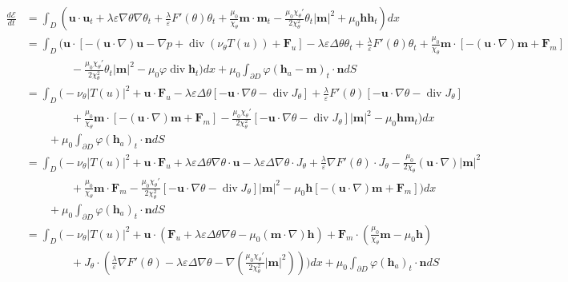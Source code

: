 \documentclass[10pt,letterpaper,twoside]{amsart}
\theoremstyle{definition}{\newtheorem{definition}[lemma]{Definition}}
\theoremstyle{note}{\newtheorem{claim}{Claim}[section]
\newtheorem*{claim*}{Claim}}
\numberwithin{equation}{section}
\newcommand{\dom}{D}
\newcommand{\Grad}{\nabla}
\newcommand{\Div}{\operatorname{div}}
\newcommand{\bu}{\mathbf{u}}
\newcommand{\bm}{\mathbf{m}}
\newcommand{\Fu}{\mathbf{F}_u}
\newcommand{\Fm}{\mathbf{F}_m}
\newcommand{\Jtheta}{J_\theta}
\newcommand{\bh}{\mathbf{h}}
\begin{document}
\begin{align*}
	\frac{d\mathcal{E}}{dt} & = \int_{\dom} \left(\bu\cdot \bu_t + \lambda \varepsilon \Grad\theta\Grad\theta_t + \frac{\lambda}{\varepsilon}F'(\theta)\theta_t +\frac{\mu_0}{\chi_\theta}\bm\cdot \bm_t -\frac{\mu_0 \chi_\theta'}{2\chi_\theta^2 }\theta_t |\bm|^2 +\mu_0 \bh \bh_t\right) dx \\
	& = \int_{\dom} \Bigg(\bu\cdot \left[-(\bu\cdot\Grad)\bu -\Grad p +\Div(\nu_\theta T(u) ) + \Fu\right] - \lambda \varepsilon \Delta\theta \theta_t + \frac{\lambda}{\varepsilon}F'(\theta)\theta_t +\frac{\mu_0}{\chi_\theta}\bm\cdot\left[-(\bu\cdot\Grad)\bm + \Fm\right]\\
	&\qquad \qquad -\frac{\mu_0 \chi_\theta'}{2\chi_\theta^2 }\theta_t |\bm|^2 -\mu_0 \varphi \Div \bh_t\Bigg) dx +\mu_0\int_{\partial\dom} \varphi (\bh_a-\bm)_t \cdot\mathbf{n} dS\\
	& = \int_{\dom} \Bigg(- \nu_\theta |T(u)|^2 + \bu\cdot \Fu - \lambda \varepsilon \Delta\theta \left[-\bu\cdot \Grad \theta -\Div\Jtheta\right] + \frac{\lambda}{\varepsilon}F'(\theta)\left[-\bu\cdot \Grad \theta -\Div\Jtheta\right]  \\
	&\qquad \qquad +\frac{\mu_0}{\chi_\theta}\bm\cdot\left[-(\bu\cdot\Grad)\bm + \Fm\right]-\frac{\mu_0 \chi_\theta'}{2\chi_\theta^2 }\left[-\bu\cdot \Grad \theta -\Div\Jtheta\right]  |\bm|^2 -\mu_0 \bh  \bm_t\Bigg) dx  \\
	&\qquad
	  + \mu_0\int_{\partial\dom} \varphi (\bh_a)_t \cdot\mathbf{n} dS\\
	& = \int_{\dom} \Bigg(- \nu_\theta |T(u)|^2 + \bu\cdot \Fu + \lambda \varepsilon \Delta\theta \Grad \theta\cdot\bu -\lambda \varepsilon \Delta\Grad\theta\cdot\Jtheta + \frac{\lambda}{\varepsilon}\Grad F'(\theta)   \cdot \Jtheta -\frac{\mu_0}{2\chi_\theta}  (\bu\cdot\Grad)|\bm|^2  \\
	&\qquad \qquad  + \frac{\mu_0}{\chi_\theta}\bm\cdot \Fm -\frac{\mu_0 \chi_\theta'}{2\chi_\theta^2 }\left[-\bu\cdot \Grad \theta -\Div\Jtheta\right]  |\bm|^2 -\mu_0 \bh  \left[-(\bu\cdot\Grad)\bm + \Fm\right]\Bigg) dx  \\
	&\qquad  + \mu_0\int_{\partial\dom} \varphi (\bh_a)_t \cdot\mathbf{n} dS\\
	& = \int_{\dom} \Bigg(- \nu_\theta |T(u)|^2 + \bu\cdot \left(\Fu +\lambda \varepsilon \Delta\theta \Grad \theta  -\mu_0 (\bm\cdot\Grad)\bh \right) +\Fm\cdot\left( \frac{\mu_0}{\chi_\theta}\bm -\mu_0\bh\right)    \\
	&\qquad \qquad +\Jtheta\cdot\left(\frac{\lambda}{\varepsilon}\Grad F'(\theta) -\lambda \varepsilon \Delta\Grad\theta-\Grad\left(\frac{\mu_0 \chi_\theta'}{2\chi_\theta^2 }|\bm|^2\right) \right)  \Bigg) dx    + \mu_0\int_{\partial\dom} \varphi (\bh_a)_t \cdot\mathbf{n} dS
\end{align*}
\end{document}
